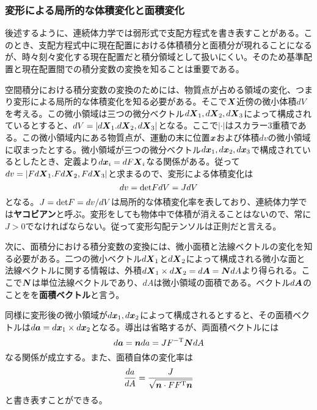 \documentclass[dvipdfmx, 9pt, a4paper]{jsarticle}
\numberwithin{equation}{section}
\newcommand{\bm}[1]{{\mbox{\boldmath $#1$}}}
\begin{document}
\subsubsection{変形による局所的な体積変化と面積変化}
後述するように、連続体力学では弱形式で支配方程式を書き表すことがある。このとき、支配方程式中に現在配置における体積積分と面積分が現れることになるが、時々刻々変化する現在配置だと積分領域として扱いにくい。そのため基準配置と現在配置間での積分変数の変換を知ることは重要である。\par
空間積分における積分変数の変換のためには、物質点が占める領域の変化、つまり変形による局所的な体積変化を知る必要がある。そこで$\bm X$近傍の微小体積$dV$を考える。この微小領域は三つの微分ベクトル$d\bm X_1, d\bm X_2, d\bm X_3$によって構成されているとすると、$dV=|d\bm X_1. d\bm X_2, d\bm X_3|$となる。ここで$|\cdot|$はスカラー3重積である。この微小領域内にある物質点が、運動の末に位置$\bm x$および体積$dv$の微小領域に収まったとする。微小領域が三つの微分ベクトル$d\bm x_1, d\bm x_2, d\bm x_3$で構成されているとしたとき、定義より$d\bm x_i=dF\bm X_i$なる関係がある。従って$dv=|Fd\bm X_1. Fd\bm X_2, Fd\bm X_3|$と求まるので、変形による体積変化は
\begin{equation}
dv={\rm det}FdV=JdV
\end{equation}
となる。$J={\rm det}F=dv/dV$は局所的な体積変化率を表しており、連続体力学では{\bf ヤコビアン}と呼ぶ。変形をしても物体中で体積が消えることはないので、常に$J>0$でなければならない。従って変形勾配テンソルは正則だと言える。\par
次に、面積分における積分変数の変換には、微小面積と法線ベクトルの変化を知る必要がある。二つの微小ベクトル$d\bm X_1$と$d\bm X_2$によって構成される微小な面と法線ベクトルに関する情報は、外積$d\bm X_1 \times d\bm X_2=d\bm A=\bm NdA$より得られる。ここで$\bm N$は単位法線ベクトルであり、$dA$は微小領域の面積である。ベクトル$d\bm A$のことをを{\bf 面積ベクトル}と言う。\par
同様に変形後の微小領域が$d\bm x_1, d\bm x_2$によって構成されるとすると、その面積ベクトルは$d\bm a=d\bm x_1 \times d\bm x_2$となる。導出は省略するが、両面積ベクトルには
\begin{equation}
d\bm a=\bm nda=JF^{-\rm T}\bm NdA
\end{equation}
なる関係が成立する。また、面積自体の変化率は
\begin{equation}
\frac{da}{dA}=\frac{J}{\sqrt{\bm n \cdot FF^{\rm T}\bm n}}
\end{equation}
と書き表すことができる。
\end{document}
